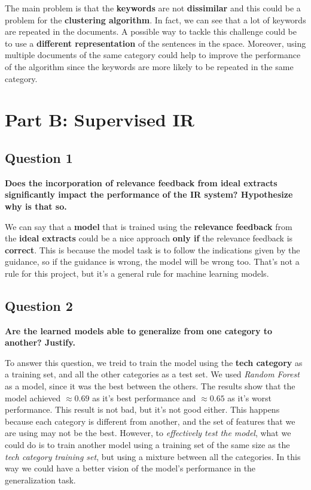 The main problem is that the \textbf{keywords} are not \textbf{dissimilar} and
this could be a problem for the \textbf{clustering algorithm}. In fact, we can
see that a lot of keywords are repeated in the documents. A possible way to
tackle this challenge could be to use a \textbf{different representation} of
the sentences in the space. Moreover, using multiple documents of the same
category could help to improve the performance of the algorithm since the
keywords are more likely to be repeated in the same category.

\section*{Part B: Supervised IR}
\subsection{Question 1}
\textbf{ Does the incorporation of relevance feedback from ideal extracts significantly impact the performance of the IR system? Hypothesize why is that so.}

We can say that a \textbf{model} that is trained using the \textbf{relevance
  feedback} from the \textbf{ideal extracts} could be a nice approach \textbf{only if} the relevance feedback is \textbf{correct}. This is 
  because the model task is to follow the indications given by the guidance, so if the guidance is wrong, the model will be wrong too. That's 
  not a rule for this project, but it's a general rule for machine learning models.

\subsection{Question 2}
\textbf{ Are the learned models able to generalize from one category to another? Justify.}

To answer this question, we treid to train the model using the \textbf{tech category} as a training set, and 
all the other categories as a test set. We used \textit{Random Forest} as a model, since it was the best between the others.
The results show that the model achieved $\approx 0.69$ as it's best performance and $\approx 0.65$ as it's worst performance. 
This result is not bad, but it's not good either. This happens because each category is different from another, and the set of features 
that we are using may not be the best. However, to \textit{effectively test the model}, what we could do is to train another model 
using a training set of the same size as the \textit{tech category training set}, but using a mixture between all the categories.
In this way we could have a better vision of the model's performance in the generalization task. 

